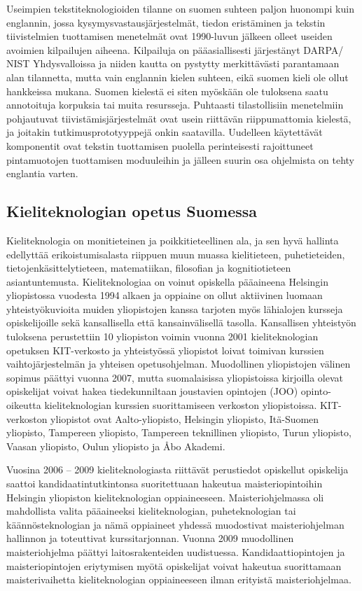 \documentclass[]{../../metanetpaper}
\begin{document}
\begin{multicols}{2}
Useimpien tekstiteknologioiden tilanne on suomen suhteen paljon
huonompi kuin englannin, jossa kysymysvastausjärjestelmät, tiedon
eristäminen ja tekstin tiivistelmien tuottamisen menetelmät ovat
1990-luvun jälkeen olleet useiden avoimien kilpailujen
aiheena. Kilpailuja on pääasiallisesti järjestänyt DARPA/ NIST
Yhdysvalloissa ja niiden kautta on pystytty merkittävästi parantamaan
alan tilannetta, mutta vain englannin kielen suhteen, eikä suomen
kieli ole ollut hankkeissa mukana. Suomen kielestä ei siten myöskään
ole tuloksena saatu annotoituja korpuksia tai muita
resursseja. Puhtaasti tilastollisiin menetelmiin pohjautuvat
tiivistämisjärjestelmät ovat usein riittävän riippumattomia kielestä,
ja joitakin tutkimusprototyyppejä onkin saatavilla. Uudelleen
käytettävät komponentit ovat tekstin tuottamisen puolella
perinteisesti rajoittuneet pintamuotojen tuottamisen moduuleihin ja
jälleen suurin osa ohjelmista on tehty englantia varten.


\subsection{Kieliteknologian opetus Suomessa}


Kieliteknologia on monitieteinen ja poikkitieteellinen ala, ja sen
hyvä hallinta edellyttää erikoistumisalasta riippuen muun muassa
kielitieteen, puhetieteiden, tietojenkäsittelytieteen, matematiikan,
filosofian ja kognitiotieteen asiantuntemusta. Kieliteknologiaa on
voinut opiskella pääaineena Helsingin yliopistossa vuodesta 1994
alkaen ja oppiaine on ollut aktiivinen luomaan yhteistyökuvioita
muiden yliopistojen kanssa tarjoten myös lähialojen kursseja
opiskelijoille sekä kansallisella että kansainvälisellä
tasolla. Kansallisen yhteistyön tuloksena perustettiin 10 yliopiston
voimin vuonna 2001 kieliteknologian opetuksen KIT-verkosto ja
yhteistyössä yliopistot loivat toimivan kurssien vaihtojärjestelmän ja
yhteisen opetusohjelman.  Muodollinen yliopistojen välinen sopimus
päättyi vuonna 2007, mutta suomalaisissa yliopistoissa kirjoilla
olevat opiskelijat voivat hakea tiedekunniltaan joustavien opintojen
(JOO) opinto-oikeutta kieliteknologian kurssien suorittamiseen
verkoston yliopistoissa. KIT-verkoston yliopistot ovat
Aalto-yliopisto, Helsingin yliopisto, Itä-Suomen yliopisto, Tampereen
yliopisto, Tampereen teknillinen yliopisto, Turun yliopisto, Vaasan
yliopisto, Oulun yliopisto ja Åbo Akademi.

Vuosina 2006 – 2009 kieliteknologiasta riittävät perustiedot
opiskellut opiskelija saattoi kandidaatintutkintonsa suoritettuaan
hakeutua maisteriopintoihin Helsingin yliopiston kieliteknologian
oppiaineeseen.  Maisteriohjelmassa oli mahdollista valita pääaineeksi
kieliteknologian, puheteknologian tai käännösteknologian ja nämä
oppiaineet yhdessä muodostivat maisteriohjelman hallinnon ja
toteuttivat kurssitarjonnan. Vuonna 2009 muodollinen maisteriohjelma
päättyi laitosrakenteiden uudistuessa.  Kandidaattiopintojen ja
maisteriopintojen eriytymisen myötä opiskelijat voivat hakeutua
suorittamaan maisterivaihetta kieliteknologian oppiaineeseen ilman
erityistä maisteriohjelmaa.


\end{multicols}
\end{document}
